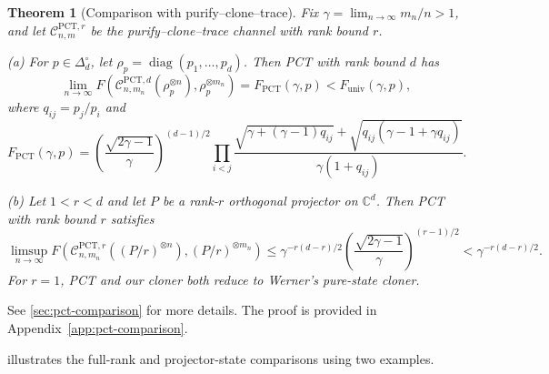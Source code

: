 \documentclass[11pt]{article}
\newtheorem{theorem}{Theorem}[section]
\theoremstyle{remark}
\theoremstyle{plain}
\newcommand{\C}{\mathbb C}
\newcommand{\cC}{\mathcal C}
\newcommand{\diag}{\operatorname{diag}}
\newcommand{\ot}{\otimes}
\newcommand{\Funiv}{F_{\mathrm{univ}}}
\begin{document}
\begin{theorem}[Comparison with purify--clone--trace]
\label{thm:pct-comparison}
Fix \(\gamma=\lim_{n\to\infty} m_n/n>1\), and let \(\cC_{n,m}^{\mathrm{PCT},r}\) be the
purify--clone--trace channel with rank bound \(r\).
\par\noindent\textup{(a)} For \(p\in\Delta_d^\circ\), let
\(\rho_p=\diag(p_1,\ldots,p_d)\). Then PCT with rank bound \(d\) has
\begin{equation}\label{eq:full-rank-pct-comparison}
  \lim_{n\to\infty}
  F\!\left(\cC_{n,m_n}^{\mathrm{PCT},d}(\rho_p^{\ot n}),
    \rho_p^{\ot m_n}\right)
  =F_{\mathrm{PCT}}(\gamma,p)<\Funiv(\gamma,p),
\end{equation}
where \(q_{ij}=p_j/p_i\) and
\begin{equation}\label{eq:pct-fidelity-closed-form}
  F_{\mathrm{PCT}}(\gamma,p)
  =\left(\frac{\sqrt{2\gamma-1}}{\gamma}\right)^{(d-1)/2}
   \prod_{i<j}
   \frac{\sqrt{\gamma+(\gamma-1)q_{ij}}
         +\sqrt{q_{ij}(\gamma-1+\gamma q_{ij})}}
        {\gamma(1+q_{ij})}.
\end{equation}
\par\noindent\textup{(b)} Let \(1<r<d\) and let \(P\) be a rank-\(r\)
orthogonal projector on \(\C^d\). Then PCT with rank bound \(r\) satisfies
\begin{equation}\label{eq:grassmann-pct-upper-bound}
  \limsup_{n\to\infty}
  F\!\left(\cC_{n,m_n}^{\mathrm{PCT},r}((P/r)^{\ot n}),
    (P/r)^{\ot m_n}\right)
  \le\gamma^{-r(d-r)/2}
  \left(\frac{\sqrt{2\gamma-1}}{\gamma}\right)^{(r-1)/2}
  <\gamma^{-r(d-r)/2}.
\end{equation}
For \(r=1\), PCT and our cloner both reduce to Werner's pure-state
cloner.
\end{theorem}
See \cref{sec:pct-comparison} for more details. The proof is provided in Appendix~\ref{app:pct-comparison}.

 illustrates the full-rank and projector-state
comparisons using two examples.
\end{document}
